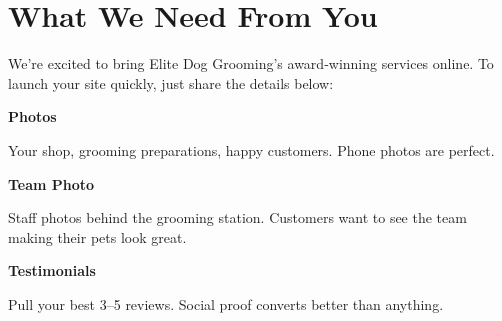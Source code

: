\documentclass[11pt,letterpaper]{article}
\begin{document}
\vspace{0.2em}

\section*{What We Need From You}

We’re excited to bring Elite Dog Grooming’s award‑winning services online. To launch your site quickly, just share the details below:

\vspace{0.12em}

\noindent\begin{minipage}[t]{0.48\textwidth}
\begin{tcolorbox}[colframe=accent-teal, boxrule=1pt, left=0.7em, right=0.7em, top=0.5em, bottom=0.5em, arc=4pt, boxsep=0pt]
{\bfseries\small\color{accent-teal}Photos}

\vspace{0.15em}

{\small Your shop, grooming preparations, happy customers. Phone photos are perfect.}
\end{tcolorbox}

\vspace{0.1em}

\begin{tcolorbox}[colframe=accent-teal, boxrule=1pt, left=0.7em, right=0.7em, top=0.5em, bottom=0.5em, arc=4pt, boxsep=0pt]
{\bfseries\small\color{accent-teal}Team Photo}

\vspace{0.15em}

{\small Staff photos behind the grooming station. Customers want to see the team making their pets look great.}
\end{tcolorbox}

\vspace{0.1em}

\begin{tcolorbox}[colframe=accent-teal, boxrule=1pt, left=0.7em, right=0.7em, top=0.5em, bottom=0.5em, arc=4pt, boxsep=0pt]
{\bfseries\small\color{accent-teal}Testimonials}

\vspace{0.15em}

{\small Pull your best 3–5 reviews. Social proof converts better than anything.}
\end{tcolorbox}
\end{minipage}
\hfill
\end{document}

